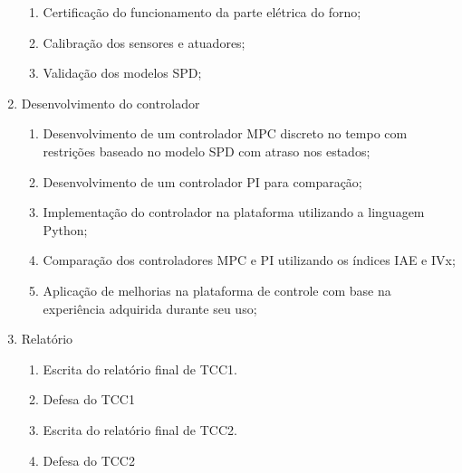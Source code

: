 \begin{enumerate}
\begin{enumerate}
                  \item Certificação do funcionamento da parte elétrica do
                        forno;
                  \item Calibração dos sensores e atuadores;
                  \item Validação dos modelos SPD\@;
            \end{enumerate}
      \item Desenvolvimento do controlador
            \begin{enumerate}
                  \item Desenvolvimento de um controlador MPC discreto no tempo
                        com restrições baseado no modelo SPD com atraso nos
                        estados;
                  \item Desenvolvimento de um controlador PI para comparação;
                  \item Implementação do controlador na plataforma utilizando a
                        linguagem Python;
                  \item Comparação dos controladores MPC e PI utilizando os
                        índices IAE e IVx;
                  \item Aplicação de melhorias na plataforma de controle com
                        base na experiência adquirida durante seu uso;
            \end{enumerate}
      \item Relatório
            \begin{enumerate}
                  \item Escrita do relatório final de TCC1.
                  \item Defesa do TCC1
                  \item Escrita do relatório final de TCC2.
                  \item Defesa do TCC2
            \end{enumerate}
\end{enumerate}

